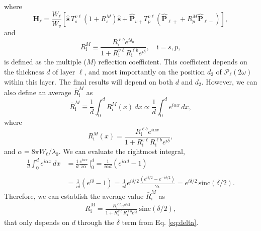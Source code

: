 where
\begin{equation}\label{eq:mr9}
\mathbf{H}_{\ell}
= \frac{W_\ell}{W_v}
\left[
\hat{\mathbf{s}}\,T_{s}^{v\ell}
\left(1+ R^{M}_{s}\right)\hat{\mathbf{s}} + \hat{\mathbf{P}}_{v+}T_{p}^{v\ell}
\left(\hat{\mathbf{P}}_{\ell +} + R^{M}_{p}\hat{\mathbf{P}}_{\ell -}\right)
\right],
\end{equation}
and
\begin{equation}\label{m61}
R^{M}_{\mathrm{i}}\equiv
\frac{R^{\ell b}_{\mathrm{i}}e^{i\delta_{0}}}
     {1+R^{v\ell}_{\mathrm{i}} R^{\ell b}_{\mathrm{i}}e^{i\delta}},
     \quad \mathrm{i}=s,p,
\end{equation}
is defined as the multiple ($M$) reflection coefficient. This coefficient
depends on the thickness $d$ of layer $\ell$, and most importantly on the
position $d_{2}$ of $\boldsymbol{\mathcal{P}}_{\ell}(2\omega)$ within this
layer. The final results will depend on both $d$ and $d_{2}$. However, we can
also define an average $\bar{R}^{M}_{\mathrm{i}}$ as
\begin{equation}\label{eq:mcave}
\bar{R}^{M}_{\mathrm{i}}\equiv 
\frac{1}{d}\int_{0}^{d}R^{M}_{\mathrm{i}}(x)\,dx\propto
\frac{1}{d}\int_{0}^{d}e^{i\alpha x}\,dx,
\end{equation}
where
\begin{equation}\label{eq:m16}
R^{M}_{\mathrm{i}}(x) = 
\frac{R^{\ell b}_{\mathrm{i}}e^{i\alpha x}}
{1 + R^{v\ell}_{\mathrm{i}}R^{\ell b}_{\mathrm{i}}e^{i\delta}},
\end{equation}
and $\alpha=8\pi W_{\ell}/\lambda_{0}$. We can evaluate the rightmost integral,
\begin{align}\label{eq:integral}
\frac{1}{d}\int_{0}^{d} e^{i\alpha x}\,dx
&= \frac{1}{d}\frac{e^{i\alpha x}}{i\alpha}\,\Bigg\vert^{d}_{0}
 = \frac{1}{i\alpha d}\left(e^{i\alpha d} - 1\right)\nonumber\\\nonumber\\
&= \frac{1}{i\delta}\left(e^{i\delta} - 1\right)
 = \frac{1}{i\delta}e^{i\delta/2}\frac{(e^{i\delta/2} - e^{-i\delta/2})}{2i}
 = e^{i\delta/2}\,\mathrm{sinc}(\delta/2).
\end{align}
Therefore, we can establish the average value $\bar{R}^{M}_{\mathrm{i}}$ as
\begin{align}\label{eq:mcave2}
\bar{R}^{M}_{\mathrm{i}} = 
\frac{R^{\ell b}_{\mathrm{i}}e^{i\delta/2}}
{1 + R^{v\ell}_{\mathrm{i}}R^{\ell b}_{\mathrm{i}}e^{i\delta}}
\,\mathrm{sinc}(\delta/2),
\end{align}
that only depends on $d$ through the $\delta$ term from Eq. \eqref{eq:delta}.

